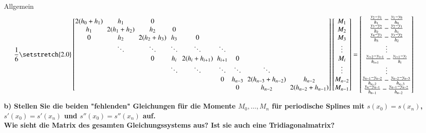 \documentclass[10pt,a4paper]{article}
\begin{document}
		Allgemein
		\begin{align*}
		\frac{1}{6} 
		\begingroup %
		\setlength\arraycolsep{3pt}
		\setstretch{2.0}
		\begin{bmatrix}
			2(h_0+h_1) & h_1        & 0          &        &                &         &         &                    &  \\
			h_1        & 2(h_1+h_2) & h_2        & 0      &                &         &         &                    &  \\
			0          & h_2        & 2(h_2+h_3) & h_3    & 0              &         &         &                    &  \\
			           & \ddots     & \ddots     & \ddots & \ddots         & \ddots  &         &                    &  \\
			           &            & 0          & h_i    & 2(h_i+h_{i+1}) & h_{i+1} & 0       &                    &  \\
			           &            &            & \ddots & \ddots         & \ddots  & \ddots  & \ddots             &  \\
			           &            &            &        &                & 0       & h_{n-3} & 2(h_{n-3}+h_{n-2}) & h_{n-2}            \\
			           &            &            &        &                &         & 0       & h_{n-2}            & 2(h_{n-2}+h_{n-1})
		\end{bmatrix}
		\endgroup
		\begin{bmatrix}
			M_1     \\
			M_2     \\
			M_3     \\
			\vdots  \\
			M_i     \\
			\vdots  \\
			M_{n-2} \\
			M_{n-1}
		\end{bmatrix}
		=
		\begin{bmatrix}
			\frac{y_{2}-y_{1}}{h_{1}}-\frac{y_{1}-y_{0}}{h_0}           \\
			\frac{y_{3}-y_{2}}{h_{2}}-\frac{y_{2}-y_{1}}{h_1}           \\
			\frac{y_{4}-y_{3}}{h_{3}}-\frac{y_{3}-y_{2}}{h_2}           \\
			\vdots \\
			\frac{y_{i+2}-y_{i+1}}{h_{i+1}}-\frac{y_{i+1}-y_i}{h_i}     \\
			\vdots \\
			\frac{y_{n-1}-y_{n-2}}{h_{n-2}}-\frac{y_{n-2}-y_{n-3}}{h_{n-3}}   \\
			\frac{y_{n}-y_{n-1}}{h_{n-1}}-\frac{y_{n-1}-y_{n-2}}{h_{n-2}}
		\end{bmatrix}
		\end{align*}			
			
	\textbf{%
		b) Stellen Sie die beiden "fehlenden" Gleichungen für die Momente $M_0, \dots, M_n$ für periodische Splines mit $s(x_0) = s(x_n)$, $s′(x_0) = s′(x_n)$ und $s''(x_0)=s''(x_n)$ auf. \\
		Wie sieht die Matrix des gesamten Gleichungssystems aus? Ist sie auch eine Tridiagonalmatrix?
	}
\end{document}
